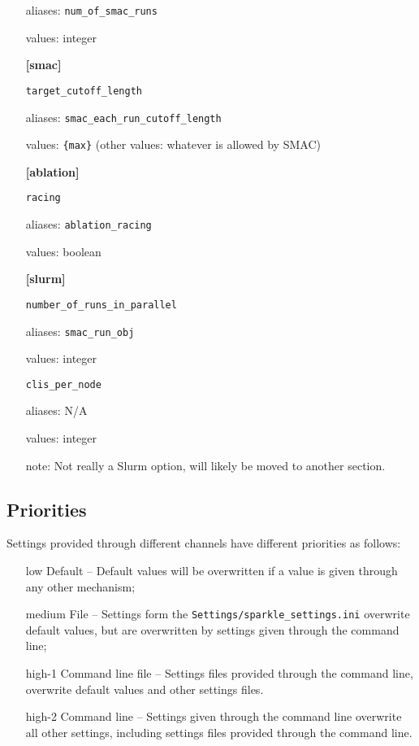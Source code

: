 \documentclass{article}
\begin{document}
\begin{itemize}[noitemsep]
          aliases: \texttt{num\_of\_smac\_runs}

          values: integer\\
  \item[] \textbf{[smac]}
  \item[] \texttt{target\_cutoff\_length}

          aliases: \texttt{smac\_each\_run\_cutoff\_length}

          values: \texttt{\{max\}} (other values: whatever is allowed by SMAC)\\
  \item[] \textbf{[ablation]}\\
  \item[] \texttt{racing}

          aliases: \texttt{ablation\_racing}

          values: boolean\\
  \item[] \textbf{[slurm]}\\
  \item[] \texttt{number\_of\_runs\_in\_parallel}

          aliases: \texttt{smac\_run\_obj}

          values: integer\\
  \item[] \texttt{clis\_per\_node}

          aliases: N/A

          values: integer

          note: Not really a Slurm option, will likely be moved to another section.\\
\end{itemize}


\subsection{Priorities}
Settings provided through different channels have different priorities as follows:

\begin{itemize}[noitemsep]
  \item[low] Default -- Default values will be overwritten if a value is given through any other mechanism;
  \item[medium] File -- Settings form the \texttt{Settings/sparkle\_settings.ini} overwrite default values, but are overwritten by settings given through the command line; 
  \item[high-1] Command line file -- Settings files provided through the command line, overwrite default values and other settings files.
  \item[high-2] Command line -- Settings given through the command line overwrite all other settings, including settings files provided through the command line.

\end{itemize}
\end{document}
